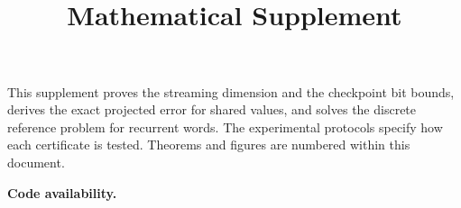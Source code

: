 \documentclass{article}
\title{\papertitle\\[5pt]{\normalsize Mathematical Supplement}}
\date{}
\begin{document}
\maketitle
\ifdefined\SupplementCopy
\noindent This supplement proves the streaming dimension and the checkpoint bit bounds, derives the exact projected error for shared values, and solves the discrete reference problem for recurrent words. The experimental protocols specify how each certificate is tested. Theorems and figures are numbered within this document.

\noindent\textbf{Code availability.} \codesentence
\else


\clearpage
\fi
\appendix

\ifdefined\SupplementCopy\clearpage\fi
\ifdefined\ReviewCopy\clearpage\fi
\end{document}
